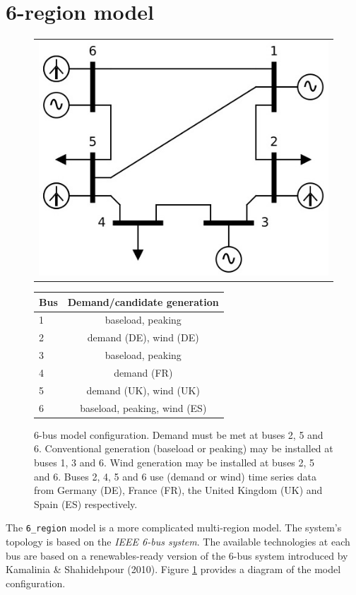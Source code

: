 \documentclass[preprint]{elsarticle}
\begin{document}
\newpage
\section{6-region model}

\begin{figure}
  \begin{tabular}{c}
    \includegraphics[scale=0.3, trim=10 40 10 40, clip]{6_region_diagram.jpg}
  \end{tabular}
  \begin{tabular}{ l  c}
  Bus & Demand/candidate generation \\ \hline
  1 & baseload, peaking \\
  2 & demand (DE), wind (DE) \\
  3 & baseload, peaking \\
  4 & demand (FR) \\
  5 & demand (UK), wind (UK) \\
  6 & baseload, peaking, wind (ES) \\ \hline
\end{tabular}
  \caption{6-bus model configuration. Demand must be met at buses 2, 5 and 6. Conventional generation (baseload or peaking) may be installed at buses 1, 3 and 6. Wind generation may be installed at buses 2, 5 and 6. Buses 2, 4, 5 and 6 use (demand or wind) time series data from Germany (DE), France (FR), the United Kingdom (UK) and Spain (ES) respectively.}
  \label{fig:model_2:model_diagram}
\end{figure}

\noindent The \texttt{6\_region} model is a more complicated multi-region model. The system's topology is based on the \textit{IEEE 6-bus system}. The available technologies at each bus are based on a renewables-ready version of the 6-bus system introduced by Kamalinia \& Shahidehpour (2010). Figure \ref{fig:model_2:model_diagram} provides a diagram of the model configuration.
\end{document}
